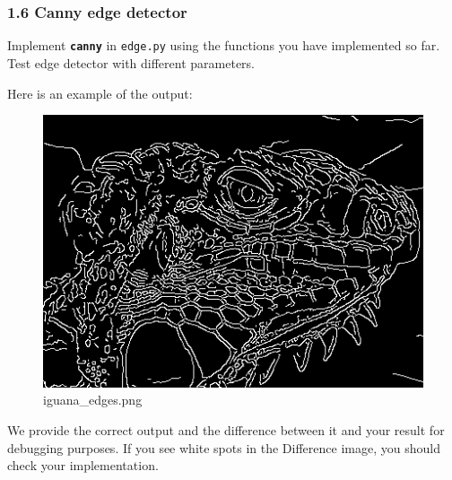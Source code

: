 \documentclass[11pt]{article}
\makeatletter
\def\maxwidth{\ifdim\Gin@nat@width>\linewidth\linewidth
    \else\Gin@nat@width\fi}
\let\Oldincludegraphics\includegraphics
\renewcommand{\includegraphics}[1]{\Oldincludegraphics[width=.8\maxwidth]{#1}}
\makeatother
\begin{document}
    \begin{center}
    \end{center}
    { \hspace*{\fill} \\}
    
    \begin{center}
    \end{center}
    { \hspace*{\fill} \\}
    
    \subsubsection{1.6 Canny edge detector}\label{canny-edge-detector}

Implement \textbf{\texttt{canny}} in \texttt{edge.py} using the
functions you have implemented so far. Test edge detector with different
parameters.

Here is an example of the output:

\begin{figure}
\centering
\includegraphics{iguana_edges.png}
\caption{iguana\_edges.png}
\end{figure}

We provide the correct output and the difference between it and your
result for debugging purposes. If you see white spots in the Difference
image, you should check your implementation.
\end{document}
